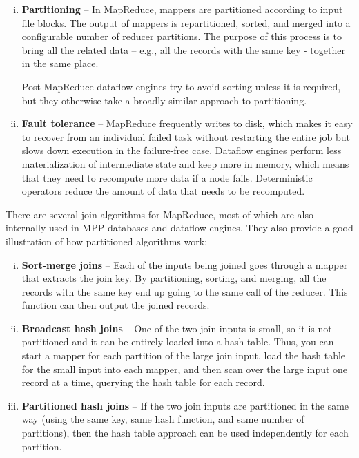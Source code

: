 \documentclass{article}
\begin{document}
    \begin{enumerate}[i.]
        \item \textbf{Partitioning} -- In MapReduce, mappers are partitioned according to input file blocks. The output of mappers is repartitioned, sorted, and merged into a configurable number of reducer partitions. The purpose of this process is to bring all the related data -- e.g., all the records with the same key - together in the same place.
        
        Post-MapReduce dataflow engines try to avoid sorting unless it is required, but they otherwise take a broadly similar approach to partitioning.
        
        \item \textbf{Fault tolerance} -- MapReduce frequently writes to disk, which makes it easy to recover from an individual failed task without restarting the entire job but slows down execution in the failure-free case. Dataflow engines perform less materialization of intermediate state and keep more in memory, which means that they need to recompute more data if a node fails. Deterministic operators reduce the amount of data that needs to be recomputed.
    \end{enumerate}
    
    There are several join algorithms for MapReduce, most of which are also internally used in MPP databases and dataflow engines. They also provide a good illustration of how partitioned algorithms work:
    
    \begin{enumerate}[i.]
        \item \textbf{Sort-merge joins} -- Each of the inputs being joined goes through a mapper that extracts the join key. By partitioning, sorting, and merging, all the records with the same key end up going to the same call of the reducer. This function can then output the joined records.
        
        \item \textbf{Broadcast hash joins} -- One of the two join inputs is small, so it is not partitioned and it can be entirely loaded into a hash table. Thus, you can start a mapper for each partition of the large join input, load the hash table for the small input into each mapper, and then scan over the large input one record at a time, querying the hash table for each record.
        
        \item \textbf{Partitioned hash joins} -- If the two join inputs are partitioned in the same way (using the same key, same hash function, and same number of partitions), then the hash table approach can be used independently for each partition.
    \end{enumerate}
    
\end{document}
